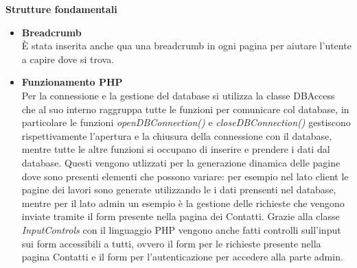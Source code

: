 \textbf{Strutture fondamentali}
\begin{itemize}
	\item \textbf{Breadcrumb}\\	È stata inserita anche qua una breadcrumb in ogni pagina per aiutare l'utente a capire dove si trova. 
	\item \textbf{Funzionamento PHP}\\	Per la connessione e la gestione del database si utilizza la classe DBAccess che al suo interno raggruppa tutte le funzioni per comunicare col database, in particolare le funzioni \textit{openDBConnection()} e \textit{closeDBConnection()} gestiscono rispettivamente l'apertura e la chiusura della connessione con il database, mentre tutte le altre funzioni si occupano di inserire e prendere i dati dal database. Questi vengono utlizzati per la generazione dinamica delle pagine dove sono presenti elementi che possono variare: per esempio nel lato client le pagine dei lavori sono generate utilizzando le i dati prensenti nel database, mentre per il lato admin un esempio è la gestione delle richieste che vengono inviate tramite il form presente nella pagina dei Contatti.
Grazie alla classe \textit{InputControls} con il linguaggio PHP vengono anche fatti controlli sull'input sui form accessibili a tutti, ovvero il form per le richieste presente nella pagina Contatti e il form per l'autenticazione per accedere alla parte admin.
\end{itemize}
